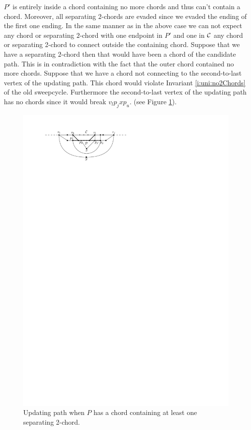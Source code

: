       $P'$ is entirely inside a chord containing no more chords and thus can't contain a chord. Moreover, all separating $2$-chords are evaded since we evaded the ending of the first one ending.  In the same manner as in the above case we can not expect any chord or separating $2$-chord with one endpoint in $P'$ and one in $\mathcal{C}$ any chord or separating 2-chord to connect outside the containing chord.
      Suppose that we have a separating $2$-chord then that would have been a chord of the candidate path. This is in contradiction with the fact that the outer chord contained no more chords.
      Suppose that we have a chord not connecting to the second-to-last vertex of the updating path. This chord would violate Invariant \ref{i:uni:no2Chords} of the old sweepcycle. Furthermore the second-to-last vertex of the updating path has no chords since it would break $v_l p_j x p_u$. (see Figure \ref{fig:sweep:2chordInChordUpdate}).

      \begin{figure}[h]
        \centering
        \includegraphics[scale=1]{unifiedAlgo/img/sweep/2chordInChordUpdate}
        \caption{Updating path when $P$ has a chord containing at least one separating 2-chord.}
        \label{fig:sweep:2chordInChordUpdate}
      \end{figure}

